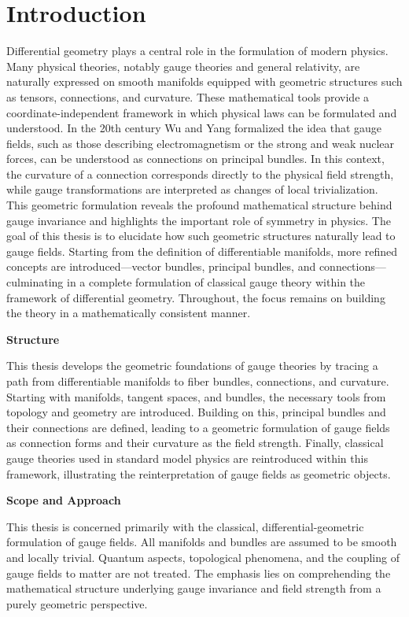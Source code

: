 \chapter{Introduction}

Differential geometry plays a central role in the formulation of modern physics. Many physical theories, notably gauge theories and general relativity, are naturally expressed on smooth manifolds equipped with geometric structures such as tensors, connections, and curvature. These mathematical tools provide a coordinate-independent framework in which physical laws can be formulated and understood. In the 20th century Wu and Yang formalized the idea that gauge fields, such as those describing electromagnetism or the strong and weak nuclear forces, can be understood as connections on principal bundles\cite{WuConceptnonintegrablephasefactorsglobalformulationgaugefields1975}. In this context, the curvature of a connection corresponds directly to the physical field strength, while gauge transformations are interpreted as changes of local trivialization. This geometric formulation reveals the profound mathematical structure behind gauge invariance and highlights the important role of symmetry in physics. The goal of this thesis is to elucidate how such geometric structures naturally lead to gauge fields. Starting from the definition of differentiable manifolds, more refined concepts are introduced—vector bundles, principal bundles, and connections—culminating in a complete formulation of classical gauge theory within the framework of differential geometry. Throughout, the focus remains on building the theory in a mathematically consistent manner. 

\textbf{Structure}

This thesis develops the geometric foundations of gauge theories by tracing a path from differentiable manifolds to fiber bundles, connections, and curvature. Starting with manifolds, tangent spaces, and bundles, the necessary tools from topology and geometry are introduced. Building on this, principal bundles and their connections are defined, leading to a geometric formulation of gauge fields as connection forms and their curvature as the field strength. Finally, classical gauge theories used in standard model physics are reintroduced within this framework, illustrating the reinterpretation of gauge fields as geometric objects.

\textbf{Scope and Approach}

This thesis is concerned primarily with the classical, differential-geometric formulation of gauge fields. All manifolds and bundles are assumed to be smooth and locally trivial. Quantum aspects, topological phenomena, and the coupling of gauge fields to matter are not treated. The emphasis lies on comprehending the mathematical structure underlying gauge invariance and field strength from a purely geometric perspective. 

